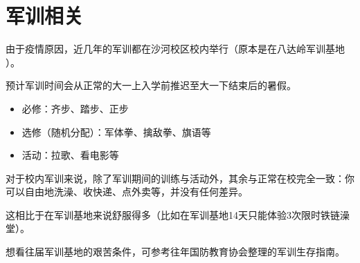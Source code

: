 \section{军训相关}


由于疫情原因，近几年的军训都在沙河校区校内举行（原本是在八达岭军训基地 ）。

预计军训时间会从正常的大一上入学前推迟至大一下结束后的暑假。


\begin{itemize}
    \item 必修：齐步、踏步、正步
    \item 选修（随机分配）：军体拳、擒敌拳、旗语等
    \item 活动：拉歌、看电影等
\end{itemize}


对于校内军训来说，除了军训期间的训练与活动外，其余与正常在校完全一致：你可以自由地洗澡、收快递、点外卖等，并没有任何差异。

这相比于在军训基地来说舒服得多（比如在军训基地14天只能体验3次限时铁链澡堂）。

想看往届军训基地的艰苦条件，可参考往年国防教育协会整理的军训生存指南。